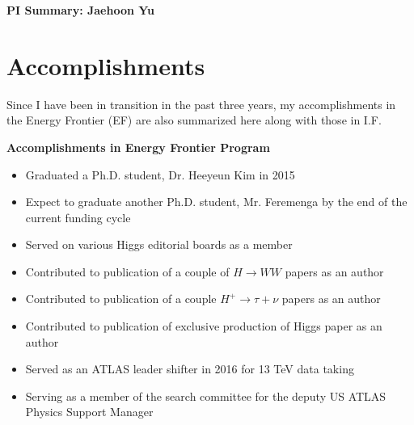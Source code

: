 \begin{center}
\LARGE\textbf{PI Summary: Jaehoon Yu}
\end{center}

\section*{\textbf{Accomplishments}}
Since I have been in transition in the past three years, my accomplishments in the Energy Frontier (EF) are also summarized here along with those in I.F. 

\noindent\textbf{Accomplishments in Energy Frontier Program}
\begin{itemize}[noitemsep,nolistsep]
\item{Graduated a Ph.D. student, Dr. Heeyeun Kim in 2015}
\item{Expect to graduate another Ph.D. student, Mr. Feremenga by the end of the current funding cycle}
\item{Served on various Higgs editorial boards as a member}
\item{Contributed to publication of a couple of $H\rightarrow WW$ papers as an author}
\item{Contributed to publication of a couple $H^{+}\rightarrow \tau+\nu$ papers as an author}
\item{Contributed to publication of exclusive production of Higgs paper as an author}
\item{Served as an ATLAS leader shifter in 2016 for 13 TeV data taking}
\item{Serving as a member of the search committee for the deputy US ATLAS Physics Support Manager}
\end{itemize}

